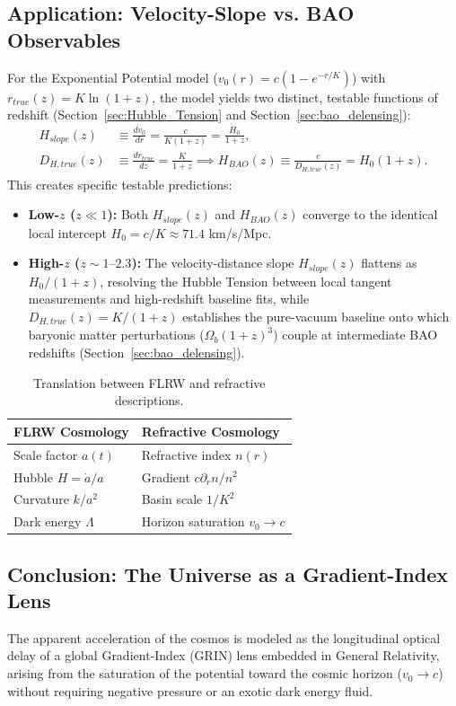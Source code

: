 \documentclass[11pt]{article}
\begin{document}
\subsection{Application: Velocity-Slope vs. BAO Observables}
For the Exponential Potential model ($v_0(r) = c(1-e^{-r/K})$) with $r_{true}(z) = K \ln(1+z)$, the model yields two distinct, testable functions of redshift (Section~\ref{sec:Hubble_Tension} and Section~\ref{sec:bao_delensing}):
\begin{align}
    H_{slope}(z) &\equiv \frac{dv_0}{dr} = \frac{c}{K(1+z)} = \frac{H_0}{1+z}, \\
    D_{H,true}(z) &\equiv \frac{dr_{true}}{dz} = \frac{K}{1+z} \implies H_{BAO}(z) \equiv \frac{c}{D_{H,true}(z)} = H_0(1+z).
\end{align}
This creates specific testable predictions:
\begin{itemize}
    \item \textbf{Low-$z$ ($z \ll 1$):} Both $H_{slope}(z)$ and $H_{BAO}(z)$ converge to the identical local intercept $H_0 = c/K \approx 71.4$ km/s/Mpc.
    \item \textbf{High-$z$ ($z \sim 1\text{--}2.3$):} The velocity-distance slope $H_{slope}(z)$ flattens as $H_0/(1+z)$, resolving the Hubble Tension between local tangent measurements and high-redshift baseline fits, while $D_{H,true}(z) = K/(1+z)$ establishes the pure-vacuum baseline onto which baryonic matter perturbations ($\Omega_b(1+z)^3$) couple at intermediate BAO redshifts (Section~\ref{sec:bao_delensing}).
\end{itemize}

\begin{table}[h]
\centering
\begin{tabular}{l|l}
\toprule
FLRW Cosmology & Refractive Cosmology \\
\midrule
Scale factor $a(t)$ & Refractive index $n(r)$ \\
Hubble $H = \dot{a}/a$ & Gradient $c \partial_r n / n^2$ \\
Curvature $k/a^2$ & Basin scale $1/K^2$ \\
Dark energy $\Lambda$ & Horizon saturation $v_0 \to c$ \\
\bottomrule
\end{tabular}
\caption{Translation between FLRW and refractive descriptions.}
\end{table}

\subsection{Conclusion: The Universe as a Gradient-Index Lens}
The apparent acceleration of the cosmos is modeled as the longitudinal optical delay of a global Gradient-Index (GRIN) lens embedded in General Relativity, arising from the saturation of the potential toward the cosmic horizon ($v_0 \to c$) without requiring negative pressure or an exotic dark energy fluid.
\end{document}
